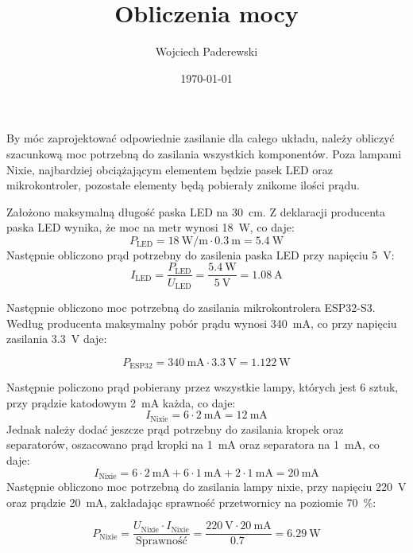 \documentclass[../main.tex]{subfiles}
\author{Wojciech Paderewski}
\date{\today}
\title{Obliczenia mocy}
\begin{document}
By móc zaprojektować odpowiednie zasilanie dla całego układu, należy obliczyć szacunkową moc potrzebną do zasilania wszystkich komponentów.
Poza lampami Nixie, najbardziej obciążającym elementem będzie pasek LED oraz mikrokontroler, pozostałe elementy będą pobierały znikome ilości prądu.

Założono maksymalną długość paska LED na \SI{30}{\centi\meter}. Z deklaracji producenta paska LED wynika, że moc na metr wynosi \SI{18}{\watt}, co daje:
\begin{equation}
    P_{\text{LED}} = \SI{18}{\watt\per\meter} \cdot \SI{0.3}{\meter} = \SI{5.4}{\watt}
\end{equation}
Następnie obliczono prąd potrzebny do zasilenia paska LED przy napięciu \SI{5}{\volt}:
\begin{equation}
    I_{\text{LED}} = \frac{P_{\text{LED}}}{U_{\text{LED}}} = \frac{\SI{5.4}{\watt}}{\SI{5}{\volt}} = \SI{1.08}{\ampere}
\end{equation}

Następnie obliczono moc potrzebną do zasilania mikrokontrolera ESP32-S3. Według producenta maksymalny pobór prądu wynosi \SI{340}{\milli\ampere},
co przy napięciu zasilania \SI{3.3}{\volt} daje:

\begin{equation}
    P_{\text{ESP32}} = \SI{340}{\milli\ampere} \cdot \SI{3.3}{\volt} = \SI{1.122}{\watt}
\end{equation}

Następnie policzono prąd pobierany przez wszystkie lampy, których jest 6 sztuk, przy prądzie katodowym \SI{2}{\milli\ampere} każda, co daje:
\begin{equation}
    I_{\text{Nixie}} = 6 \cdot \SI{2}{\milli\ampere} = \SI{12}{\milli\ampere}
\end{equation}
Jednak należy dodać jeszcze prąd potrzebny do zasilania kropek oraz separatorów, oszacowano prąd kropki na \SI{1}{\milli\ampere} oraz separatora na \SI{1}{\milli\ampere}, co daje:
\begin{equation}
    I_{\text{Nixie}} = 6 \cdot \SI{2}{\milli\ampere} + 6 \cdot \SI{1}{\milli\ampere} + 2 \cdot \SI{1}{\milli\ampere} = \SI{20}{\milli\ampere}
\end{equation}
Następnie obliczono moc potrzebną do zasilania lampy nixie, przy napięciu \SI{220}{\volt} oraz prądzie \SI{20}{\milli\ampere}, zakładając 
sprawność przetwornicy na poziomie \SI{70}{\percent}:

\begin{equation}
    P_{\text{Nixie}} = \frac{U_{\text{Nixie}} \cdot I_{\text{Nixie}}}{\text{Sprawność}} = \frac{\SI{220}{\volt} \cdot \SI{20}{\milli\ampere}}{\SI{0.7}{}} = \SI{6.29}{\watt}
\end{equation}
\end{document}
